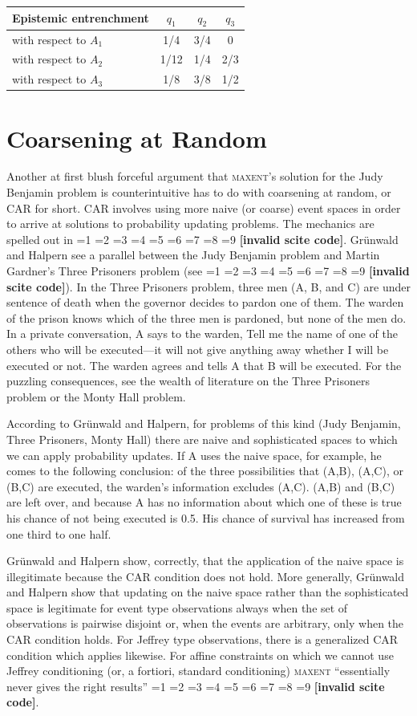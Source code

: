 \documentclass[smallextended]{svjour3}       %
\newcommand{\nonsc}[1]{}
\newcommand{\qeins}[1]{``#1''}
\newcommand{\PageP}{p.~}
\newcommand{\PageP}{}
\newcommand{\scite}[3]{\ifnum#1=1\cite{#2}\else
\ifnum#1=2\cite[{\PageP}~#3]{#2}\else
\ifnum#1=3\cite[{\PageP}~#3]{#2}\else
\ifnum#1=4\cite{#2}\else
\ifnum#1=5\cite{#2}\else
\ifnum#1=6\cite[{\PageP}~#3]{#2}\else
\ifnum#1=7\cite{#2}\else
\ifnum#1=8\cite[{\PageP}~#3]{#2}\else
\ifnum#1=9\cite[{\PageP}~#3]{#2}\else
\textbf{[invalid scite code]}\fi\fi\fi\fi\fi\fi\fi\fi\fi}
\begin{document}
\begin{tabular}{|l|c|c|c|}\hline
Epistemic entrenchment & $q_{1}$ & $q_{2}$ & $q_{3}$ \\ \hline
with respect to $A_{1}$ & 1/4 & 3/4 & 0 \\ \hline
with respect to $A_{2}$ & 1/12 & 1/4 & 2/3 \\ \hline
with respect to $A_{3}$ & 1/8 & 3/8 & 1/2 \\ \hline
\end{tabular}

\section{Coarsening at Random}

Another at first blush forceful argument that \textsc{maxent}'s
solution for the Judy Benjamin problem is counterintuitive has to do
with coarsening at random, or CAR for short. CAR involves using more
naive (or coarse) event spaces in order to arrive at solutions to
probability updating problems. The mechanics are spelled out in
\scite{1}{gruenwaldhalpern03}{}\nonsc{}. Gr{\"u}nwald and Halpern see
a parallel between the Judy Benjamin problem and Martin Gardner's
Three Prisoners problem (see \scite{8}{gardner59}{180f}). In the Three
Prisoners problem, three men (A, B, and C) are under sentence of death
when the governor decides to pardon one of them. The warden of the
prison knows which of the three men is pardoned, but none of the men
do. In a private conversation, A says to the warden, Tell me the name
of one of the others who will be executed---it will not give anything
away whether I will be executed or not. The warden agrees and tells A
that B will be executed. For the puzzling consequences, see the wealth
of literature on the Three Prisoners problem or the Monty Hall
problem.

According to Gr{\"u}nwald and Halpern, for problems of this kind (Judy
Benjamin, Three Prisoners, Monty Hall) there are naive and
sophisticated spaces to which we can apply probability updates. If A
uses the naive space, for example, he comes to the following
conclusion: of the three possibilities that (A,B), (A,C), or (B,C) are
executed, the warden's information excludes (A,C). (A,B) and (B,C) are
left over, and because A has no information about which one of these
is true his chance of not being executed is 0.5. His chance of
survival has increased from one third to one half. 

Gr{\"u}nwald and Halpern show, correctly, that the application of the
naive space is illegitimate because the CAR condition does not hold.
More generally, Gr{\"u}nwald and Halpern show that updating on the
naive space rather than the sophisticated space is legitimate for
event type observations always when the set of observations is
pairwise disjoint or, when the events are arbitrary, only when the CAR
condition holds. For Jeffrey type observations, there is a generalized
CAR condition which applies likewise. For affine constraints on which
we cannot use Jeffrey conditioning (or, a fortiori, standard
conditioning) \textsc{maxent }\qeins{essentially never gives the right
  results} \scite{2}{gruenwaldhalpern03}{243}.
\end{document}
